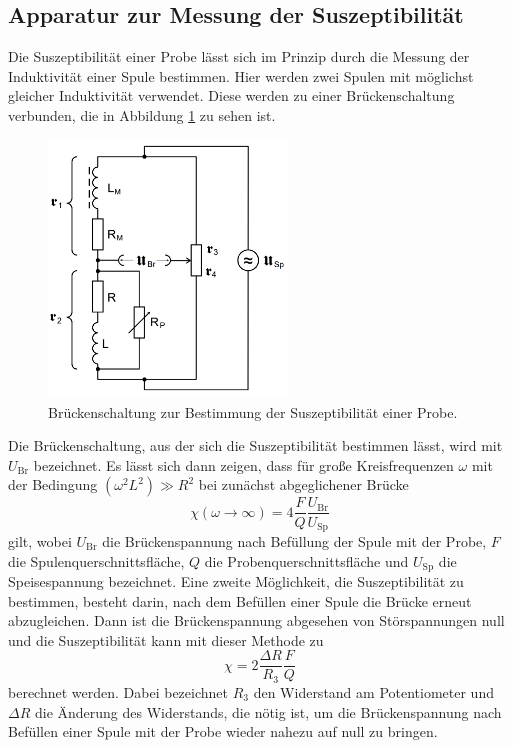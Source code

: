 \subsection{Apparatur zur Messung der Suszeptibilität}
\label{subsec:apparatur}

Die Suszeptibilität einer Probe lässt sich im Prinzip durch die Messung
der Induktivität einer Spule bestimmen. Hier werden zwei Spulen mit möglichst gleicher
Induktivität verwendet. Diese werden zu einer Brückenschaltung verbunden, die in Abbildung
\ref{fig:brueckenschaltung} zu sehen ist.

\begin{figure}
  \centering
  \includegraphics[width=180pt]{data/bruecke.png}
  \caption{Brückenschaltung zur Bestimmung der Suszeptibilität einer Probe\cite{Versuchsanleitung}.}
  \label{fig:brueckenschaltung}
\end{figure}

Die Brückenschaltung, aus der sich die Suszeptibilität bestimmen lässt, wird mit $U_\text{Br}$ bezeichnet.
Es lässt sich dann zeigen, dass für große Kreisfrequenzen $\omega$ mit der Bedingung
$(\omega^2 L ^2) \gg R^2$ bei zunächst abgeglichener Brücke
\begin{equation}
  \chi(\omega \to \infty) = 4 \frac{F}{Q} \frac{U_\text{Br}}{U_\text{Sp}}
  \label{eqn:spannung}
\end{equation}
gilt, wobei $U_\text{Br}$ die Brückenspannung nach Befüllung der Spule mit der Probe,
$F$ die Spulenquerschnittsfläche, $Q$ die Probenquerschnittsfläche und $U_\text{Sp}$ die Speisespannung bezeichnet.
Eine zweite Möglichkeit, die Suszeptibilität zu bestimmen, besteht darin, nach dem Befüllen
einer Spule die Brücke erneut abzugleichen. Dann ist die Brückenspannung abgesehen von Störspannungen
null und die Suszeptibilität kann mit dieser Methode zu
\begin{equation}
  \chi = 2 \frac{\Delta R}{R_3} \frac{F}{Q}
  \label{eqn:widerstand}
\end{equation}
berechnet werden. Dabei bezeichnet $R_3$ den Widerstand am Potentiometer und $\Delta R$
die Änderung des Widerstands, die nötig ist, um die Brückenspannung nach Befüllen
einer Spule mit der Probe wieder nahezu auf null zu bringen.

